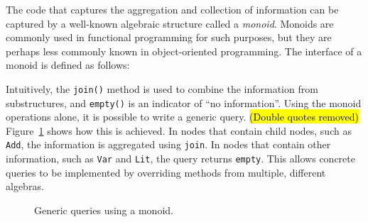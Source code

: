 
The code that captures the aggregation and collection of information
can be captured by a well-known algebraic structure called a
\emph{monoid}. Monoids are commonly used in functional programming
for such purposes, but they are perhaps less commonly known in
object-oriented programming.  The interface of a monoid is defined as follows:
\begin{quote}
\end{quote}
Intuitively, the \lstinline{join()} method is
used to combine the information from substructures, and
\lstinline{empty()} is an indicator of ``no information''.
Using the monoid operations alone, it is possible to write a generic
query. \hl{(Double quotes removed)} Figure~\ref{generic_query} shows how this is achieved. In
nodes that contain child nodes, such as \lstinline{Add}, the
information is aggregated using \lstinline{join}. In nodes that
contain other information, such as \lstinline{Var} and
\lstinline{Lit}, the query returns \lstinline{empty}.
This allows concrete queries to be implemented by overriding methods from multiple, different algebras.

\begin{figure}[tb]
\nocaptionrule
\caption{Generic queries using a monoid.}
\label{generic_query}
\end{figure}

\begin{comment}
And now we find everything goes in an easier way: we don't care about
what kind of query it is any more during the traversal. Despite
whether it asks for all the names of free variables or a printer
showing the hierarchy of an expression, at first we can simply
override the method \lstinline{m()}, which provides an instance of
\lstinline{Monoid}, in the return statement. As the next step, we only
need to override a few other methods to meet the requirements. This is
the progress, once we have such a template dealing with the traversal,
all query algebras can be addressed in a more concise way, which is
called the \textit{generic query algebra}.
\end{comment}

